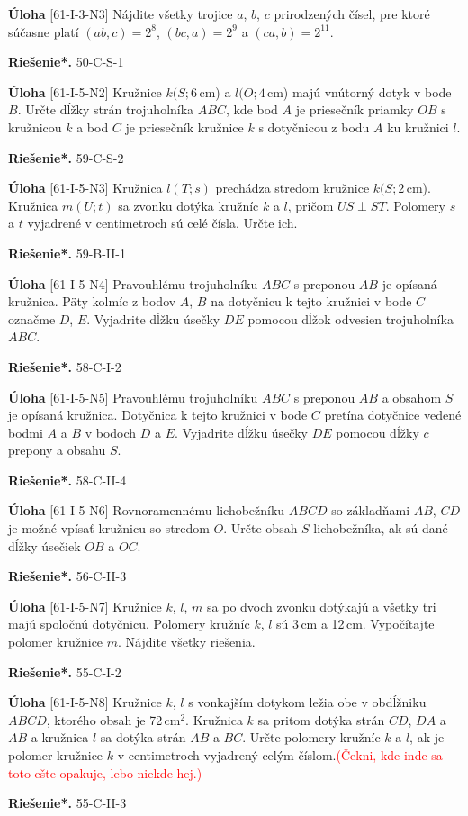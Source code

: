 \documentclass{article}
\newcommand{\rieh}{\textbf{Riešenie*.} }
\newcommand\todo[1]{\noindent\textcolor{red}{(#1)}}
\newcommand{\problem}[4]{
  \begin{tcolorbox}[breakable,notitle,boxrule=0pt,colback=light-gray,colframe=light-gray]
    \textbf{Úloha}
    [#1] #3
  \end{tcolorbox}
  \noindent#4
}
\begin{document}
\problem{61-I-3-N3}{}{
Nájdite všetky trojice $a$, $b$, $c$ prirodzených čísel, pre ktoré súčasne platí $(ab, c) = 2^8$, $(bc, a) = 2^9$ a $(ca, b) = 2^{11}$.
}{
\rieh 50-C-S-1
}


\problem{61-I-5-N2}{}{
Kružnice $k(S; 6$\,cm) a $l(O; 4$\,cm) majú vnútorný dotyk v bode $B$. Určte dĺžky strán trojuholníka $ABC$, kde bod $A$ je priesečník priamky $OB$ s kružnicou $k$ a bod $C$ je priesečník kružnice $k$ s dotyčnicou z bodu $A$ ku kružnici $l$.
}{
\rieh 59-C-S-2
}

\problem{61-I-5-N3}{}{
Kružnica $l(T ; s)$ prechádza stredom kružnice $k(S; 2$\,cm). Kružnica $m(U; t)$ sa zvonku dotýka kružníc $k$ a $l$, pričom $US \perp ST$. Polomery $s$ a $t$ vyjadrené v centimetroch sú
celé čísla. Určte ich.
}{
\rieh 59-B-II-1
}


\problem{61-I-5-N4}{}{
Pravouhlému trojuholníku $ABC$ s preponou $AB$ je opísaná kružnica. Päty kolmíc z bodov $A$, $B$ na dotyčnicu k tejto kružnici v bode $C$ označme $D$, $E$. Vyjadrite dĺžku úsečky $DE$ pomocou dĺžok odvesien trojuholníka $ABC$.
}{
\rieh 58-C-I-2
}


\problem{61-I-5-N5}{}{
Pravouhlému trojuholníku $ABC$ s preponou $AB$ a obsahom $S$ je opísaná kružnica. Dotyčnica k tejto kružnici v bode $C$ pretína dotyčnice vedené bodmi $A$ a $B$ v bodoch $D$ a $E$. Vyjadrite dĺžku úsečky $DE$ pomocou dĺžky $c$ prepony a obsahu $S$.
}{
\rieh 58-C-II-4
}


\problem{61-I-5-N6}{}{
Rovnoramennému lichobežníku $ABCD$ so základňami $AB$, $CD$ je možné vpísať kružnicu so stredom $O$. Určte obsah $S$ lichobežníka, ak sú dané dĺžky úsečiek $OB$ a $OC$.
}{
\rieh 56-C-II-3
}


\problem{61-I-5-N7}{}{
Kružnice $k$, $l$, $m$ sa po dvoch zvonku dotýkajú a všetky tri majú spoločnú dotyčnicu. Polomery kružníc $k$, $l$ sú 3\,cm a 12\,cm. Vypočítajte polomer kružnice $m$. Nájdite všetky riešenia.
}{
\rieh 55-C-I-2
}


\problem{61-I-5-N8}{}{
Kružnice $k$, $l$ s vonkajším dotykom ležia obe v obdĺžniku $ABCD$, ktorého obsah je 72\,cm$^2$. Kružnica $k$ sa pritom dotýka strán $CD$, $DA$ a $AB$ a kružnica $l$ sa dotýka strán $AB$ a $BC$. Určte polomery kružníc $k$ a $l$, ak je polomer kružnice $k$ v centimetroch vyjadrený celým číslom.\todo{Čekni, kde inde sa toto ešte opakuje, lebo niekde hej.}
}{
\rieh 55-C-II-3
}
\end{document}
